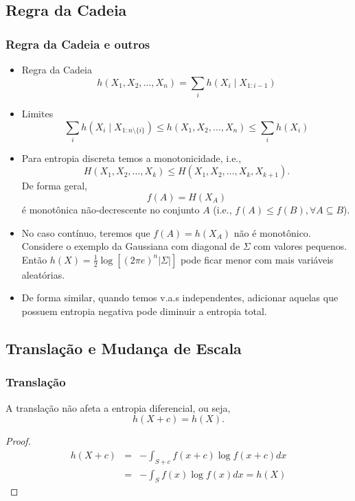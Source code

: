 \subsection{Regra da Cadeia}
\begin{frame}[allowframebreaks]
  \frametitle{Regra da Cadeia e outros}
  \begin{itemize}
  \item Regra da Cadeia
	\begin{equation}
	h(X_1, X_2, \ldots, X_n) = \sum_i h(X_i \mid X_{1:i-1})
	\end{equation}
  \item Limites
	\begin{equation}
	\sum_i h(X_i \mid X_{1:n \setminus \{i\}}) \leq h(X_1, X_2, \ldots, X_n) \leq \sum_i h(X_i)
	\end{equation}
  \item Para entropia discreta temos a monotonicidade, i.e.,
	\begin{equation}
	H(X_1, X_2, \ldots, X_k) \leq H(X_1, X_2, \dots, X_k, X_{k+1}) .
	\end{equation}
	De forma geral,
	\begin{equation}
	f(A) = H(X_A)
	\end{equation}
	é monotônica não-decrescente no conjunto $A$ (i.e., $f(A) \leq f(B), \forall A \subseteq B$).
  \item No caso contínuo, teremos que $f(A) = h(X_A)$ não é monotônico. Considere o exemplo da Gaussiana
	com diagonal de $\Sigma$ com valores pequenos. Então $h(X) = \frac{1}{2} \log \left[ (2\pi e)^n \vert \Sigma \vert \right]$
	pode ficar menor com mais variáveis aleatórias.
  \item De forma similar, quando temos v.a.s independentes, adicionar aquelas que possuem entropia negativa pode diminuir a entropia total.
  \end{itemize}
\end{frame}


\subsection{Translação e Mudança de Escala}
\begin{frame}[allowframebreaks]
  \frametitle{Translação}

  \begin{theorem}
    A translação não afeta a entropia diferencial, ou seja,
    \begin{equation}
    h(X + c) = h(X) .
    \end{equation}
  \end{theorem}

  \begin{proof}
    \begin{eqnarray}
    h(X + c) &=& - \int_{S + c} f(x+c) \log f(x + c) dx \\
	&=& - \int_{S} f(x) \log f(x) dx = h(X)
    \end{eqnarray}
  \end{proof}
\end{frame}


